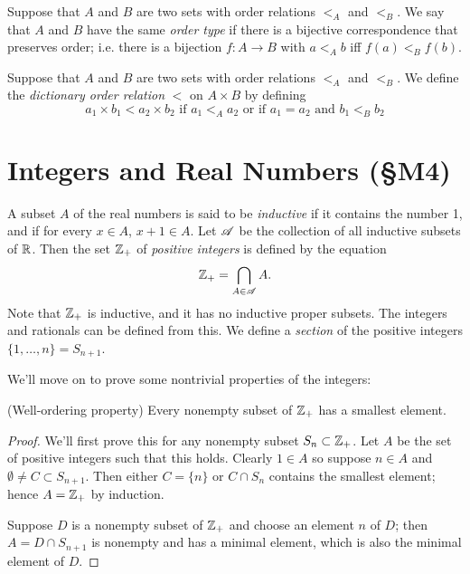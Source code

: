 \documentclass{report}
\begin{document}
\begin{definition}
  Suppose that $A$ and $B$ are two sets with order relations $<_A$ and $<_B$.
  We say that $A$ and $B$ have the same \emph{order type} if there is a bijective correspondence that preserves order;
  i.e. there is a bijection $f:A \rightarrow B$ with $a <_A b$ iff $f(a) <_B f(b)$.
\end{definition}

\begin{definition}
  Suppose that $A$ and $B$ are two sets with order relations $<_A$ and $<_B$.
  We define the \emph{dictionary order relation} $<$ on $A \times B$ by defining
  \[
    a_1 \times b_1 < a_2 \times b_2 \text{ if } a_1 <_A a_2 \text{ or if } a_1 = a_2 \text{ and } b_1 <_B b_2
  \]
\end{definition}

\section{Integers and Real Numbers (\S M4)}
\begin{definition}
  A subset $A$ of the real numbers is said to be \emph{inductive} if it contains the number 1, and if for every $x \in A$, $x + 1 \in A$.
  Let $\mathscr{A}$ be the collection of all inductive subsets of $\mathbb{R}$. Then the set $\mathbb{Z}_+$ of \emph{positive integers} is defined by the equation
  \[
    \mathbb{Z}_+ = \bigcap_{A \in \mathscr{A}} A.
  \]
  Note that $\mathbb{Z}_+$ is inductive, and it has no inductive proper subsets.
  The integers and rationals can be defined from this.
  We define a \emph{section} of the positive integers $\{1,\dots,n\} = S_{n+1}$.
\end{definition}
We'll move on to prove some nontrivial properties of the integers:
\begin{theorem}
  {\normalfont (Well-ordering property)} Every nonempty subset of $\mathbb{Z}_+$ has a smallest element.
\end{theorem}
\begin{proof}
  We'll first prove this for any nonempty subset $S_n \subset \mathbb{Z}_+$.
  Let $A$ be the set of positive integers such that this holds.
  Clearly $1 \in A$ so suppose $n \in A$ and $\emptyset \neq C \subset S_{n+1}$.
  Then either $C = \{n\}$ or $C \cap S_n$ contains the smallest element;
  hence $A = \mathbb{Z}_+$ by induction.

  Suppose $D$ is a nonempty subset of $\mathbb{Z}_+$ and choose an element $n$ of $D$; then $A = D \cap S_{n+1}$ is nonempty and has a minimal element, which is also the  minimal element of $D$.
\end{proof}
\end{document}

